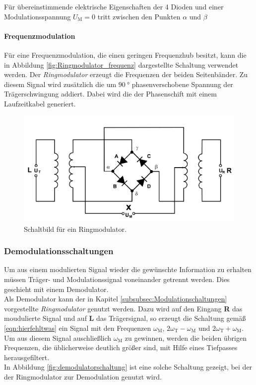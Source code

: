 Für übereinstimmende elektrische Eigenschaften
der 4 Dioden und einer Modulationsspannung $U_{\text{M}}=0$
tritt zwischen den Punkten $\alpha$ und $\beta$






\paragraph{Frequenzmodulation}
Für eine Frequenzmodulation, die einen geringen Frequenzhub besitzt,
kann die in Abbildung \ref{fig:Ringmodulator_frequenz} dargestellte
Schaltung verwendet werden.
Der \textit{Ringmodulator} erzeugt die Frequenzen der beiden Seitenbänder.
Zu diesem Signal wird zusätzlich die um $\SI{90}{\degree}$ phasenverschobene
Spannung der Trägerschwingung addiert. Dabei wird die der Phasenschift
mit einem Laufzeitkabel generiert.

\begin{figure}
  \centering
  \includegraphics{figures/Ringmodulator.PNG}
  \caption{Schaltbild für ein Ringmodulator.}
  \label{fig:Ringmodulator}
\end{figure}

\subsubsection{Demodulationsschaltungen}
\label{subsubsec:demodulationschaltungen}
Um aus einem modulierten Signal wieder die gewünschte Information zu erhalten
müssen Träger- und Modulationssignal voneinander getrennt werden.
Dies geschieht mit einem Demodulator.\\
Als Demodulator kann der in Kapitel \ref{subsubsec:Modulationschaltungen}
vorgestellte \textit{Ringmodulator} genutzt werden.
Dazu wird auf den Eingang \textbf{R} das moudulierte Signal und
auf \textbf{L} das Trägersignal, so erzeugt die Schaltung
gemäß \eqref{eqn:hierfehltwas} ein Signal mit den Frequenzen
$\omega_{\text{M}}$, $2\omega_{\text{T}} - \omega_{\text{M}}$
und $2\omega_{\text{T}} + \omega_{\text{M}}$.
Um aus diesem Signal auschließlich $\omega_{\text{M}}$ zu gewinnen,
werden die beiden übrigen Frequenzen, die üblicherweise deutlich größer sind,
mit Hilfe eines Tiefpasses herausgefiltert.\\
In Abbildung \ref{fig:demodulatorschaltung} ist eine solche Schaltung gezeigt,
bei der der Ringmodulator zur Demodulation genutzt wird.
